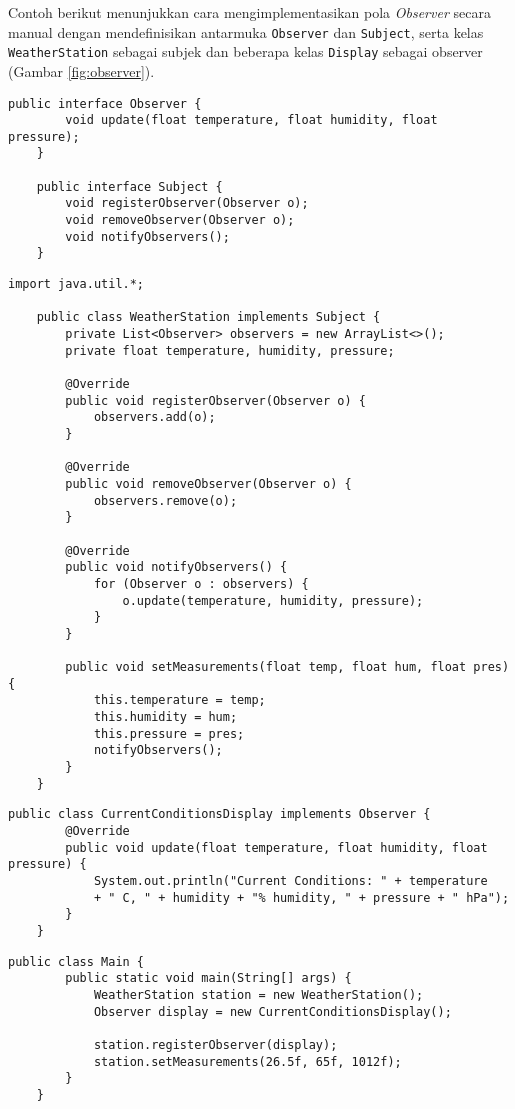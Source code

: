 Contoh berikut menunjukkan cara mengimplementasikan pola \textit{Observer} secara manual dengan mendefinisikan antarmuka \texttt{Observer} dan \texttt{Subject}, serta kelas \texttt{WeatherStation} sebagai subjek dan beberapa kelas \texttt{Display} sebagai observer (Gambar \ref{fig:observer}).

\begin{lstlisting}[style=JavaStyle, caption={Antarmuka Subject dan Observer}]
	public interface Observer {
		void update(float temperature, float humidity, float pressure);
	}
	
	public interface Subject {
		void registerObserver(Observer o);
		void removeObserver(Observer o);
		void notifyObservers();
	}
\end{lstlisting}

\begin{lstlisting}[style=JavaStyle, caption={Kelas WeatherStation sebagai Subject}]
	import java.util.*;
	
	public class WeatherStation implements Subject {
		private List<Observer> observers = new ArrayList<>();
		private float temperature, humidity, pressure;
		
		@Override
		public void registerObserver(Observer o) {
			observers.add(o);
		}
		
		@Override
		public void removeObserver(Observer o) {
			observers.remove(o);
		}
		
		@Override
		public void notifyObservers() {
			for (Observer o : observers) {
				o.update(temperature, humidity, pressure);
			}
		}
		
		public void setMeasurements(float temp, float hum, float pres) {
			this.temperature = temp;
			this.humidity = hum;
			this.pressure = pres;
			notifyObservers();
		}
	}
\end{lstlisting}

\begin{lstlisting}[style=JavaStyle, caption={Observer: CurrentConditionsDisplay}]
	public class CurrentConditionsDisplay implements Observer {
		@Override
		public void update(float temperature, float humidity, float pressure) {
			System.out.println("Current Conditions: " + temperature 
			+ " C, " + humidity + "% humidity, " + pressure + " hPa");
		}
	}
\end{lstlisting}

\begin{lstlisting}[style=JavaStyle, caption={Client: Main}]
	public class Main {
		public static void main(String[] args) {
			WeatherStation station = new WeatherStation();
			Observer display = new CurrentConditionsDisplay();
			
			station.registerObserver(display);
			station.setMeasurements(26.5f, 65f, 1012f);
		}
	}
\end{lstlisting}


